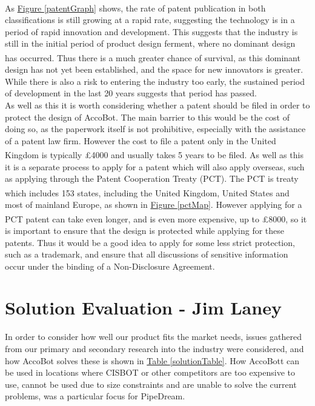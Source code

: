 \documentclass[11pt]{article}		%
\newcommand{\supercite}[1]{\textsuperscript{\cite{#1}}}		%
\newcommand{\figref}[1]{\hyperref[#1]{Figure \ref*{#1}}}    %
\newcommand{\tableref}[1]{\hyperref[#1]{Table \ref*{#1}}}     %
\begin{document}
		\\
		As \figref{patentGraph} shows, the rate of patent publication in both classifications is still growing at a rapid rate, suggesting the technology is in a period of rapid innovation and development.
		This suggests that the industry is still in the initial period of product design ferment, where no dominant design has occurred\supercite{christensen1998innovation}.
		Thus there is a much greater chance of survival, as this dominant design has not yet been established, and the space for new innovators is greater.
		While there is also a risk to entering the industry too early, the sustained period of development in the last 20 years suggests that period has passed.
		\\
		As well as this it is worth considering whether a patent should be filed in order to protect the design of AccoBot.
		The main barrier to this would be the cost of doing so, as the paperwork itself is not prohibitive, especially with the assistance of a patent law firm.
		However the cost to file a patent only in the United Kingdom is typically £4000 and usually takes 5 years to be filed\supercite{uk2020patenting}.
		As well as this it is a separate process to apply for a patent which will also apply overseas, such as applying through the Patent Cooperation Treaty (PCT).
		The PCT is treaty which includes 153 states\supercite{pct2020states}, including the United Kingdom, United States and most of mainland Europe, as shown in \figref{pctMap}.
		However applying for a PCT patent can take even longer, and is even more expensive, up to £8000\supercite{mewburn2020international}, so it is important to ensure that the design is protected while applying for these patents.
		Thus it would be a good idea to apply for some less strict protection, such as a trademark, and ensure that all discussions of sensitive information occur under the binding of a Non-Disclosure Agreement.
	
	\section[Solution Evaluation - EEM]{Solution Evaluation - Jim Laney} \label{solutionEvaluation}
	
		In order to consider how well our product fits the market needs, issues gathered from our primary and secondary research into the industry were considered, and how AccoBot solves these is shown in \tableref{solutionTable}.
		How AccoBott can be used in locations where CISBOT or other competitors are too expensive to use, cannot be used due to size constraints and are unable to solve the current problems, was a particular focus for PipeDream. %
		
\end{document}
